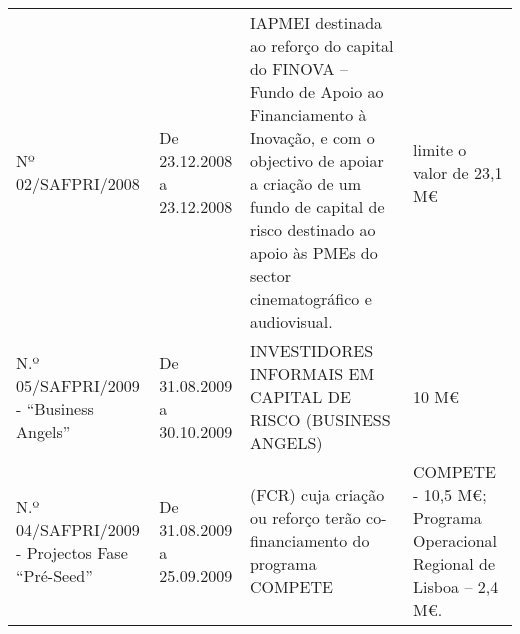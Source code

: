 \documentclass[]{book}
\newcommand{\euro}{€}
\theoremstyle{definition}
\theoremstyle{definition}
\theoremstyle{definition}
\theoremstyle{remark}
\begin{document}
\begin{longtable}[]{@{}llll@{}}
\begin{minipage}[t]{0.17\columnwidth}\raggedright\strut
Nº 02/SAFPRI/2008\strut
\end{minipage} & \begin{minipage}[t]{0.17\columnwidth}\raggedright\strut
De 23.12.2008 a 23.12.2008\strut
\end{minipage} & \begin{minipage}[t]{0.17\columnwidth}\raggedright\strut
IAPMEI destinada ao reforço do capital do FINOVA -- Fundo de Apoio ao
Financiamento à Inovação, e com o objectivo de apoiar a criação de um
fundo de capital de risco destinado ao apoio às PMEs do sector
cinematográfico e audiovisual.\strut
\end{minipage} & \begin{minipage}[t]{0.17\columnwidth}\raggedright\strut
limite o valor de 23,1 M\euro{}\strut
\end{minipage}\tabularnewline
\begin{minipage}[t]{0.17\columnwidth}\raggedright\strut
N.º 05/SAFPRI/2009 - ``Business Angels''\strut
\end{minipage} & \begin{minipage}[t]{0.17\columnwidth}\raggedright\strut
De 31.08.2009 a 30.10.2009\strut
\end{minipage} & \begin{minipage}[t]{0.17\columnwidth}\raggedright\strut
INVESTIDORES INFORMAIS EM CAPITAL DE RISCO (BUSINESS ANGELS)\strut
\end{minipage} & \begin{minipage}[t]{0.17\columnwidth}\raggedright\strut
10 M\euro{}\strut
\end{minipage}\tabularnewline
\begin{minipage}[t]{0.17\columnwidth}\raggedright\strut
N.º 04/SAFPRI/2009 - Projectos Fase ``Pré-Seed''\strut
\end{minipage} & \begin{minipage}[t]{0.17\columnwidth}\raggedright\strut
De 31.08.2009 a 25.09.2009\strut
\end{minipage} & \begin{minipage}[t]{0.17\columnwidth}\raggedright\strut
(FCR) cuja criação ou reforço terão co-financiamento do programa
COMPETE\strut
\end{minipage} & \begin{minipage}[t]{0.17\columnwidth}\raggedright\strut
COMPETE - 10,5 M\euro{}; Programa Operacional Regional de Lisboa -- 2,4
M\euro{}.\strut
\end{minipage}\tabularnewline

\end{longtable}
\end{document}

